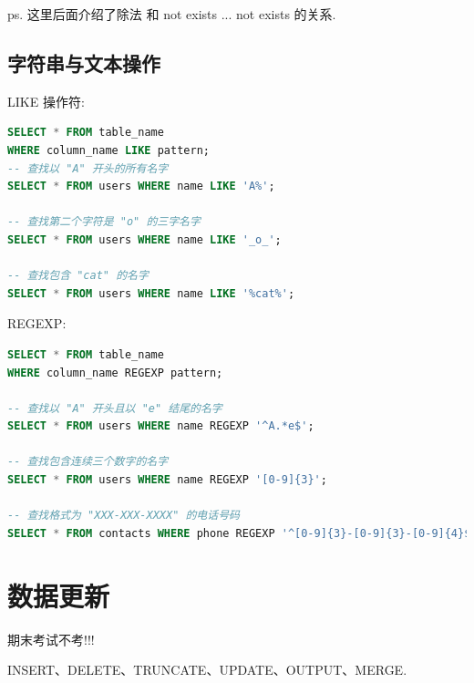 ps. 这里后面介绍了除法 和 not exists ... not exists 的关系.

\subsection{字符串与文本操作}

LIKE 操作符:
\begin{lstlisting}[language=SQL]
SELECT * FROM table_name 
WHERE column_name LIKE pattern;
-- 查找以 "A" 开头的所有名字
SELECT * FROM users WHERE name LIKE 'A%';

-- 查找第二个字符是 "o" 的三字名字
SELECT * FROM users WHERE name LIKE '_o_';

-- 查找包含 "cat" 的名字
SELECT * FROM users WHERE name LIKE '%cat%';
\end{lstlisting}


REGEXP:
\begin{lstlisting}[language=SQL]
SELECT * FROM table_name 
WHERE column_name REGEXP pattern;

-- 查找以 "A" 开头且以 "e" 结尾的名字
SELECT * FROM users WHERE name REGEXP '^A.*e$';

-- 查找包含连续三个数字的名字
SELECT * FROM users WHERE name REGEXP '[0-9]{3}';

-- 查找格式为 "XXX-XXX-XXXX" 的电话号码
SELECT * FROM contacts WHERE phone REGEXP '^[0-9]{3}-[0-9]{3}-[0-9]{4}$';
\end{lstlisting}

\section{数据更新}

\begin{remark}
  期末考试不考!!!
\end{remark}

INSERT、DELETE、TRUNCATE、UPDATE、OUTPUT、MERGE.

